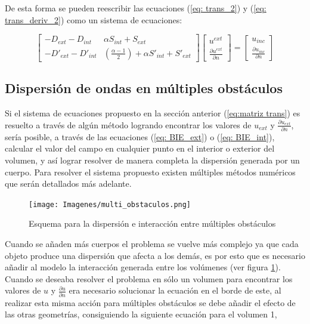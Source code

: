 \documentclass[12pt,letterpaper]{article}
\numberwithin{equation}{section}
\begin{document}
De esta forma se pueden reescribir las ecuaciones (\ref{eq: trans_2}) y (\ref{eq: trans_deriv_2}) como un sistema de ecuaciones:

\begin{equation} 
\begin{bmatrix}
-D_{ext} - D_{int} & \alpha S_{int} + S_{ext}\\
-D'_{ext} - D'_{int} & (\frac{\alpha - 1}{2})+\alpha S'_{int} + S'_{ext}
\end{bmatrix}
\begin{bmatrix}
u^{ext}\\
\frac{\partial u^{ext}}{\partial n}
\end{bmatrix}
=
\begin{bmatrix}
u_{inc}\\
\frac{\partial u_{inc}}{\partial n}
\end{bmatrix}
\label{eq:matriz trans}		 
\end{equation} 

\pagebreak
\subsection{Dispersión de ondas en múltiples obstáculos}
Si el sistema de ecuaciones propuesto en la sección anterior (\ref{eq:matriz trans}) es resuelto a través de algún método logrando encontrar los valores de $u_{ext}$ y $\frac{\partial u_{ext}}{\partial n}$, sería posible, a través de las ecuaciones (\ref{eq: BIE_ext}) o (\ref{eq: BIE_int}), calcular el valor del campo en cualquier punto en el interior o exterior del volumen, y así lograr resolver de manera completa la dispersión generada por un cuerpo. Para resolver el sistema propuesto existen múltiples métodos numéricos que serán detallados más adelante.

\begin{figure}[H]
	\centering\texttt{[image: Imagenes/multi\_obstaculos.png]}
	\caption{Esquema para la dispersión e interacción entre múltiples obstáculos}
	\label{fig:esquema_multi_obstaculos}
\end{figure}

Cuando se añaden más cuerpos el problema se vuelve más complejo ya que cada objeto produce una dispersión que afecta a los demás, es por esto que es necesario añadir al modelo la interacción generada entre los volúmenes \cite{Multiple scattering} (ver figura \ref{fig:esquema_multi_obstaculos}). Cuando se deseaba resolver el problema en sólo un volumen para encontrar los valores de $u$ y $\frac{\partial u}{\partial n}$ era necesario solucionar la ecuación en el borde de este, al realizar esta misma acción para múltiples obstáculos se debe añadir el efecto de las otras geometrías, consiguiendo la siguiente ecuación para el volumen 1,
\end{document}
